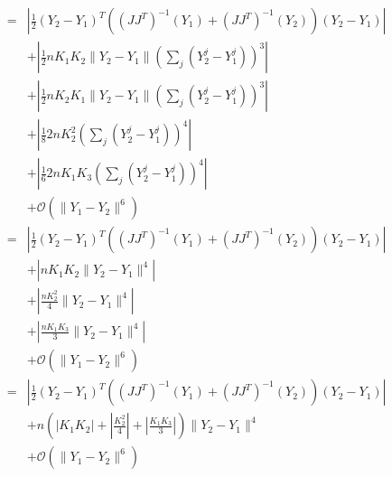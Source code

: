 \documentclass[12pt]{article}
\begin{document}
\begin{eqnarray}
&= & \left| \frac{1}{2} (Y_2 - Y_1 )^T ((J J^T)^{-1} (Y_1) + (J J^T)^{-1}(Y_2)) (Y_2 - Y_1 ) \right| \\
&& + \left|\frac{1}{2}  n K_1 K_2 \| Y_2 - Y_1 \| \left( \sum_j (Y^j_2 - Y^j_1 ) \right)^3 \right| \\
&& + \left|\frac{1}{2} n K_2 K_1 \| Y_2 - Y_1 \| \left( \sum_j (Y^j_2 - Y^j_1 ) \right)^3 \right| \\
&& + \left| \frac{1}{8} 2 n K_2^2 \left( \sum_j (Y^j_2 - Y^j_1 ) \right)^4 \right| \\
&& + \left| \frac{1}{6}   2 n K_1 K_3 \left( \sum_j (Y^j_2 - Y^j_1 ) \right)^4 \right| \\
&& + \mathcal{O} (\|Y_1 - Y_2 \|^6 ) \\ 
&= & \left| \frac{1}{2} (Y_2 - Y_1 )^T ((J J^T)^{-1} (Y_1) + (J J^T)^{-1}(Y_2)) (Y_2 - Y_1 ) \right| \\
&& + \left| n K_1 K_2 \| Y_2 - Y_1 \| ^4 \right| \\
&& + \left| \frac{ n K_2^2}{4}  \| Y_2 - Y_1 \| ^4 \right| \\
&& + \left| \frac{n K_1 K_3}{3}   \| Y_2 - Y_1 \| ^4 \right| \\
&& + \mathcal{O} (\|Y_1 - Y_2 \|^6 ) \\
&=& \left| \frac{1}{2} (Y_2 - Y_1 )^T ((J J^T)^{-1} (Y_1) + (J J^T)^{-1}(Y_2)) (Y_2 - Y_1 ) \right| \\
&& + n \left( \left| K_1 K_2 \right| + \left| \frac{ K_2^2}{4} \right|  + \left| \frac{K_1 K_3}{3} \right|  \right) \| Y_2 - Y_1 \| ^4  \\
&& + \mathcal{O} (\|Y_1 - Y_2 \|^6 ) 
\end{eqnarray}
\end{document}
